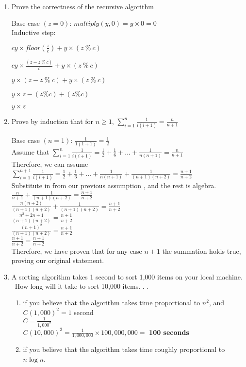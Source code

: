 \documentclass[12pt]{article}
\begin{document}
\begin{enumerate}
\item Prove the correctness of the recursive algorithm

Base case $(z = 0)$: $multiply(y, 0) = y \times 0 = 0$\\
Inductive step:

$cy \times floor(\frac{z}{c}) + y \times (z\ \%\ c)$

$cy \times \frac{(z - z\ \%\ c)}{c} + y \times (z\ \%\ c)$

$y \times (z - z\ \%\ c) + y \times (z\ \%\ c)$

$y \times z - (z\% c) + (z\% c)$

$y \times z$


\pagebreak
\item Prove by induction that for $n \geq 1$, $\sum_{i=1} ^{n}{\frac{1}{i(i+1)}} = \frac{n}{n+1}$

Base case $(n=1)$: $\frac{1}{1(1+1)} = \frac{1}{2}$\\
Assume that $\sum_{i=1} ^{n}{\frac{1}{i(i+1)}} = \frac{1}{2} + \frac{1}{6} + . . . + \frac{1}{n(n+1)} = \frac{n}{n+1}$\\
Therefore, we can assume $\sum_{i=1} ^{n+1}{\frac{1}{i(i+1)}} = \frac{1}{2} + \frac{1}{6} + . . . + \frac{1}{n(n+1)} + \frac{1}{(n+1)(n+2)}= \frac{n+1}{n+2}$\\
Substitute in from our previous assumption , and the rest is algebra.\\

$\frac{n}{n+1} + \frac{1}{(n+1)(n+2)}= \frac{n+1}{n+2}$\\
$\frac{n(n+2)}{(n+1)(n+2)} + \frac{1}{(n+1)(n+2)}= \frac{n+1}{n+2}$\\
$\frac{n^2+2n+1}{(n+1)(n+2)}= \frac{n+1}{n+2}$\\
$\frac{(n+1)^2}{(n+1)(n+2)}= \frac{n+1}{n+2}$\\
$\frac{n+1}{n+2} = \frac{n+1}{n+2}$\\

Therefore, we have proven that for any case $n+1$ the summation holds true, proving our original statement.
\pagebreak
\item A sorting algorithm takes 1 second to sort 1,000 items on your local machine. \ 
How long will it take to sort 10,000 items. . .
    \begin{enumerate}
        \item if you believe that the algorithm takes time proportional to $n^2$, and\vspace{0.05in}\\
            $C(1,000)^2=1$ second \vspace{0.05in}\\
            $C = \frac{1}{1,000^2}$ \vspace{0.05in}\\
            $C(10,000)^2 = \frac{1}{1,000,000} \times 100,000,000 =$ {\bf 100 seconds} \\
        \item if you believe that the algorithm takes time roughly proportional to $n \log n$.
            

\end{enumerate}
\end{enumerate}
\end{document}
